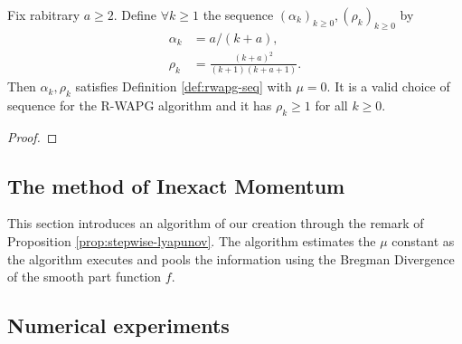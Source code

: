 \documentclass[12pt]{article}
\begin{document}
    \begin{lemma}
        Fix rabitrary $a \ge 2$.
        Define $\forall k \ge 1$ the sequence $(\alpha_k)_{k \ge 0}, (\rho_k)_{k \ge 0}$ by 
        \begin{align*}
            \alpha_k &= a/(k + a), 
            \\
            \rho_k &= \frac{(k + a)^2}{(k + 1)(k + a + 1)}. 
        \end{align*}
        Then $\alpha_k, \rho_k$ satisfies Definition \ref{def:rwapg-seq} with $\mu = 0$. 
        It is a valid choice of sequence for the R-WAPG algorithm and it has $\rho_k \ge 1$ for all $k \ge 0$. 
    \end{lemma}
    \begin{proof}
        

    \end{proof}



\subsection{The method of Inexact Momentum}
    This section introduces an algorithm of our creation through the remark of Proposition \ref*{prop:stepwise-lyapunov}. 
    The algorithm estimates the $\mu$ constant as the algorithm executes and pools the information using the Bregman Divergence of the smooth part function $f$. 

\subsection{Numerical experiments}






\appendix
\end{document}
